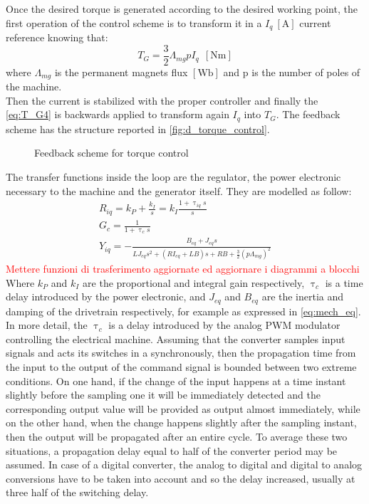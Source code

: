 Once the desired torque is generated according to the desired working point, the first operation of the control scheme is to transform it in a $I_q \ \left[\si{\ampere}\right]$ current reference knowing that:
\begin{equation}
    T_G = \frac{3}{2}\Lambda_{mg} p I_q \ \ \left[\si{\newton\meter}\right]
    \label{eq:T_G4}
\end{equation}
where $\Lambda_{mg}$ is the permanent magnets flux $\left[\si{\weber}\right]$ and p is the number of poles of the machine.\\
Then the current is stabilized with the proper controller and finally the \autoref{eq:T_G4} is backwards applied to transform again $I_q$ into $T_G$. The feedback scheme has the structure reported in \autoref{fig:d_torque_control}.

\begin{figure}[htb]
    \centering
    
    \caption{Feedback scheme for torque control}
    \label{fig:d_torque_control}
\end{figure}

The transfer functions inside the loop are the regulator, the power electronic necessary to the machine and the generator itself. They are modelled as follow:
\begin{gather}
    R_{iq}=k_P + \frac{k_I}{s}=k_I\frac{1+\uptau_{iq}s}{s}
    \label{eq:R_iq}\\
    G_c = \frac{1}{1+\uptau_cs}
    \label{eq:G_c}\\
    Y_{iq} = -\frac{B_{eq} + J_{eq}s}{LJ_{eq}s^2+\left(RI_{eq} + L B\right)s + RB + \frac{3}{2}(p\Lambda_{mg})^2}
    \label{eq:Y_iq}
\end{gather}
\textcolor{red}{Mettere funzioni di trasferimento aggiornate ed aggiornare i diagrammi a blocchi}\\
Where $k_P$ and $k_I$ are the proportional and integral gain respectively, $\uptau_c$ is a time delay introduced by the power electronic, and $J_{eq}$ and $B_{eq}$ are the inertia and damping of the drivetrain respectively, for example as expressed in \autoref{eq:mech_eq}.\\
In more detail, the $\uptau_c$ is a delay introduced by the analog PWM modulator controlling the electrical machine. Assuming that the converter samples input signals and acts its switches in a synchronously, then the propagation time from the input to the output of the command signal is bounded between two extreme conditions. On one hand, if the change of the input happens at a time instant slightly before the sampling one it will be immediately detected and the corresponding output value will be provided as output almost immediately, while on the other hand, when the change happens slightly after the sampling instant, then the output will be propagated after an entire cycle. To average these two situations, a propagation delay equal to half of the converter period may be assumed. In case of a digital converter, the analog to digital and digital to analog conversions have to be taken into account and so the delay increased, usually at three half of the switching delay.